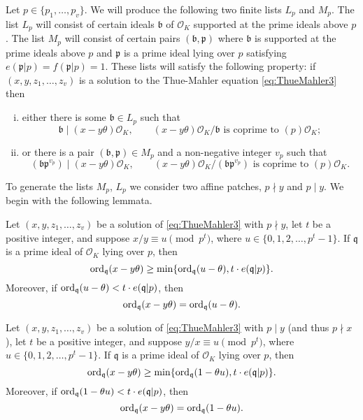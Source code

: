 Let $p \in \{p_1, \dots, p_v\}$. We will produce the following two finite lists $L_p$ and $M_p$. The list $L_p$ will
consist of certain ideals $\mathfrak{b}$ of $\mathcal{O}_K$ supported at the prime ideals above $p$. The list $M_p$ will consist of certain pairs $(\mathfrak{b},\mathfrak{p})$ where $\mathfrak{b}$ is supported at the prime ideals above $p$ and $\mathfrak{p}$ is a prime ideal lying over $p$ satisfying $e(\mathfrak{p}|p)=f(\mathfrak{p}|p)=1$. These lists will satisfy the following property: if $(x,y,z_1,\dots,z_v)$ is a solution to the Thue-Mahler equation \eqref{eq:ThueMahler3} then
\begin{enumerate}[(i)]
\item either there is some $\mathfrak{b} \in L_p$
such that
\begin{equation} \label{eq:Lp}
\mathfrak{b} \mid (x-y\theta )\mathcal{O}_K, \qquad \text{$(x-y\theta)\mathcal{O}_K/\mathfrak{b}$ is coprime to $(p)\mathcal{O}_K$};
\end{equation}
\item or there is a pair $(\mathfrak{b},\mathfrak{p}) \in M_p$ and a non-negative integer $v_p$ such that
\begin{equation} \label{eq:Mp}
(\mathfrak{b} \mathfrak{p}^{v_p}) \mid (x-y\theta)\mathcal{O}_K, \qquad \text{$(x-y\theta)\mathcal{O}_K/(\mathfrak{b} \mathfrak{p}^{v_p})$ is coprime to $(p)\mathcal{O}_K$}.
\end{equation}
\end{enumerate}

To generate the lists $M_p$, $L_p$ we consider two affine patches, $p \nmid y$ and $p \mid y$. We begin with the following lemmata.

\begin{lemma} \label{lem:AffinePatch1}
Let $(x,y,z_1, \dots, z_v)$ be a solution of \eqref{eq:ThueMahler3} with $p \nmid y$, let $t$ be a positive integer, and suppose $x/y \equiv u \pmod{p^t}$, where ${u \in \{0,1,2,\dotsc,p^{t}-1\}}$. If $\mathfrak{q}$ is a prime ideal of $\mathcal{O}_K$ lying over $p$, then
\[\operatorname{ord}_{\mathfrak{q}}(x-y\theta)\ge \min\{\operatorname{ord}_{\mathfrak{q}}(u-\theta), t \cdot e(\mathfrak{q}|p)\}.\]
Moreover, if $\operatorname{ord}_{\mathfrak{q}}(u-\theta) < t \cdot e(\mathfrak{q}|p)$, then
\[\operatorname{ord}_\mathfrak{q}(x-y\theta) = \operatorname{ord}_{\mathfrak{q}}(u-\theta).\]
\end{lemma}

\begin{lemma} \label{lem:AffinePatch2}
Let $(x,y,z_1, \dots, z_v)$ be a solution of \eqref{eq:ThueMahler3} with $p \mid y$ (and thus $p \nmid x$), let $t$ be a positive integer, and suppose $y/x \equiv u \pmod{p^t}$, where $u \in \{0,1,2,\dotsc,p^{t}-1\}$. If $\mathfrak{q}$ is a prime ideal of $\mathcal{O}_K$ lying over $p$, then
\[\operatorname{ord}_{\mathfrak{q}}(x-y\theta)\ge \min\{\operatorname{ord}_{\mathfrak{q}}(1-\theta u), t \cdot e(\mathfrak{q}|p)\}.\]
Moreover, if $\operatorname{ord}_{\mathfrak{q}}(1-\theta u) < t \cdot e(\mathfrak{q}|p)$, then
\[\operatorname{ord}_\mathfrak{q}(x-y\theta) = \operatorname{ord}_{\mathfrak{q}}(1 - \theta u).\]
\end{lemma}

